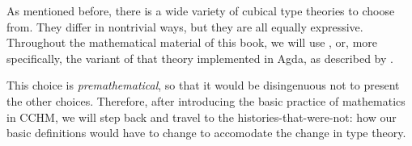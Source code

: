 \begin{node}
%
As mentioned before, there is a wide variety of cubical type theories to
choose from. They differ in nontrivial ways, but they are all equally
expressive. Throughout the mathematical material of this book, we will
use \cite{CCHM:2016}, or, more specifically, the variant of that theory
implemented in Agda, as described by \cite{Vezzosi:2019}.
%
\end{node}

\begin{node}
%
This choice is \emph{premathematical}, so that it would be disingenuous
not to present the other choices. Therefore, after introducing the basic
practice of mathematics in CCHM, we will step back and travel to the
histories-that-were-not: how our basic definitions would have to change
to accomodate the change in type theory.
%
\end{node}
